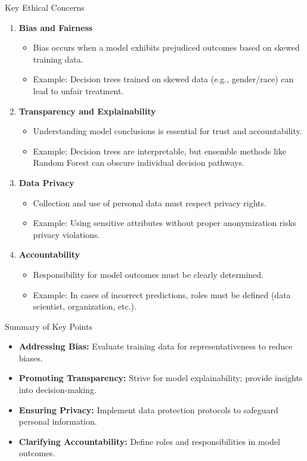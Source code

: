 \documentclass[aspectratio=169]{beamer}
\begin{document}
\begin{frame}[fragile]{Key Ethical Concerns}
    \begin{enumerate}
        \item \textbf{Bias and Fairness}
        \begin{itemize}
            \item Bias occurs when a model exhibits prejudiced outcomes based on skewed training data.
            \item Example: Decision trees trained on skewed data (e.g., gender/race) can lead to unfair treatment.
        \end{itemize}
        
        \item \textbf{Transparency and Explainability}
        \begin{itemize}
            \item Understanding model conclusions is essential for trust and accountability.
            \item Example: Decision trees are interpretable, but ensemble methods like Random Forest can obscure individual decision pathways.
        \end{itemize}
        
        \item \textbf{Data Privacy}
        \begin{itemize}
            \item Collection and use of personal data must respect privacy rights.
            \item Example: Using sensitive attributes without proper anonymization risks privacy violations.
        \end{itemize}
        
        \item \textbf{Accountability}
        \begin{itemize}
            \item Responsibility for model outcomes must be clearly determined.
            \item Example: In cases of incorrect predictions, roles must be defined (data scientist, organization, etc.).
        \end{itemize}
    \end{enumerate}
\end{frame}

\begin{frame}[fragile]{Summary of Key Points}
    \begin{itemize}
        \item \textbf{Addressing Bias:} Evaluate training data for representativeness to reduce biases.
        \item \textbf{Promoting Transparency:} Strive for model explainability; provide insights into decision-making.
        \item \textbf{Ensuring Privacy:} Implement data protection protocols to safeguard personal information.
        \item \textbf{Clarifying Accountability:} Define roles and responsibilities in model outcomes.
    \end{itemize}
\end{frame}
\end{document}

